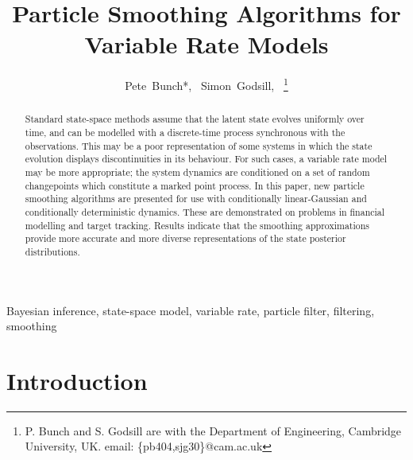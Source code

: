 \documentclass[10pt,twocolumn,twoside]{IEEEtran}
\begin{document}
\title{Particle Smoothing Algorithms for Variable Rate Models}

\author{Pete~Bunch*,~
        Simon~Godsill,~%
\thanks{P. Bunch and S. Godsill are with the Department
of Engineering, Cambridge University, UK. email: \{pb404,sjg30\}@cam.ac.uk}%
}%



\maketitle

\begin{abstract}
Standard state-space methods assume that the latent state evolves uniformly over time, and can be modelled with a discrete-time process synchronous with the observations. This may be a poor representation of some systems in which the state evolution displays discontinuities in its behaviour. For such cases, a variable rate model may be more appropriate; the system dynamics are conditioned on a set of random changepoints which constitute a marked point process. In this paper, new particle smoothing algorithms are presented for use with conditionally linear-Gaussian and conditionally deterministic dynamics. These are demonstrated on problems in financial modelling and target tracking. Results indicate that the smoothing approximations provide more accurate and more diverse representations of the state posterior distributions.
\end{abstract}

\begin{IEEEkeywords}
Bayesian inference, state-space model, variable rate, particle filter, filtering, smoothing
\end{IEEEkeywords}



\section{Introduction}
\end{document}
